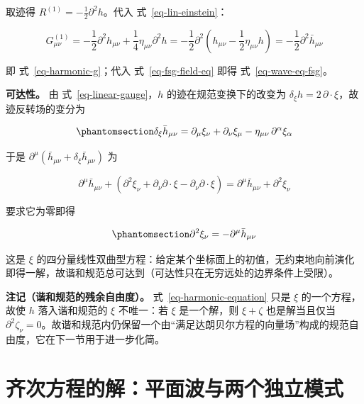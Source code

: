 \documentclass[
  chinese,
  a4paper,
  UTF8,
  12pt,
  oneside,
  openany]{ctexbook}
\theoremstyle{plain}
\theoremstyle{plain}
\theoremstyle{plain}
\theoremstyle{definition}
\theoremstyle{plain}
\theoremstyle{plain}
\theoremstyle{remark}
\begin{document}
取迹得 \(R^{(1)}=-\frac{1}{2}\partial^{2}h\)。代入
式~\ref{eq-lin-einstein}：

\[
G^{(1)}_{\mu\nu}
= -\frac{1}{2}\partial^{2} h_{\mu\nu}+\frac{1}{4}\eta_{\mu\nu}\partial^{2} h
= -\frac{1}{2}\partial^{2}\left(h_{\mu\nu}-\frac{1}{2}\eta_{\mu\nu}h\right)
= -\frac{1}{2}\partial^{2}\bar h_{\mu\nu}
\]

即 式~\ref{eq-harmonic-g}；代入 式~\ref{eq-fsg-field-eq} 即得
式~\ref{eq-wave-eq-fsg}。

\textbf{可达性。} 由 式~\ref{eq-linear-gauge}，\(h\)
的迹在规范变换下的改变为
\(\delta_{\xi}h=2\,\partial\cdot\xi\)，故迹反转场的变分为

\begin{equation}\protect\phantomsection\label{eq-gauge-trace-reverse}{
\delta_{\xi}\bar h_{\mu\nu}
= \partial_{\mu}\xi_{\nu}+\partial_{\nu}\xi_{\mu}-\eta_{\mu\nu}\,\partial^{\alpha}\xi_{\alpha}
}\end{equation}

于是
\(\partial^{\mu}\left(\bar h_{\mu\nu}+\delta_{\xi}\bar h_{\mu\nu}\right)\)
为

\[
\partial^{\mu}\bar h_{\mu\nu}+\left(\partial^{2}\xi_{\nu}+\partial_{\nu}\partial\cdot\xi-\partial_{\nu}\partial\cdot\xi\right)
=\partial^{\mu}\bar h_{\mu\nu}+\partial^{2}\xi_{\nu}
\]

要求它为零即得

\begin{equation}\protect\phantomsection\label{eq-harmonic-equation}{
\partial^{2}\xi_{\nu}=-\partial^{\mu}\bar h_{\mu\nu}
}\end{equation}

这是 \(\xi\)
的四分量线性双曲型方程：给定某个坐标面上的初值，无约束地向前演化即得一解，故谐和规范总可达到（可达性只在无穷远处的边界条件上受限）。

\textbf{注记（谐和规范的残余自由度）。} 式~\ref{eq-harmonic-equation}
只是 \(\xi\) 的一个方程，故使 \(h\) 落入谐和规范的 \(\xi\) 不唯一：若
\(\xi\) 是一个解，则 \(\xi+\zeta\) 也是解当且仅当
\(\partial^{2}\zeta_{\nu}=0\)。故谐和规范内仍保留一个由``满足达朗贝尔方程的向量场''构成的规范自由度，它在下一节用于进一步化简。

\section{齐次方程的解：平面波与两个独立模式}\label{sec-fsg-waves}
\end{document}

